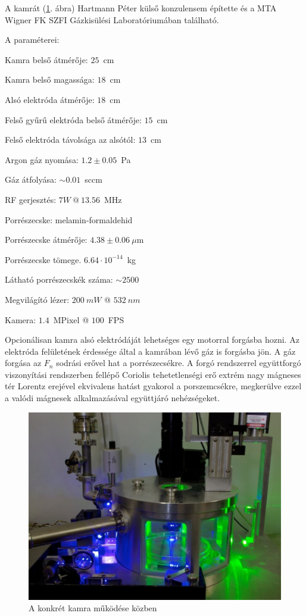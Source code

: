	A kamrát (\ref{fig:kamra}. ábra) Hartmann Péter külső konzulensem építette és a MTA Wigner FK SZFI
	Gázkisülési Laboratóriumában található.
	
	\noindent A paraméterei:
	\begin{myitemize*}
		\item Kamra belső átmérője: $25$~cm
		\item Kamra belső magassága: $18$~cm
		\item Alsó elektróda átmérője: $18$~cm
		\item Felső gyűrű elektróda belső átmérője: $15$~cm
		\item Felső elektróda távolsága az alsótól: $13$~cm
		\item Argon gáz nyomása: $1.2\pm0.05$~Pa
		\item Gáz átfolyása: $\sim 0.01$~sccm
		\item RF gerjesztés: $7W\ @ \ 13.56$~MHz
		\item Porrészecske: melamin-formaldehid
		\item Porrészecske átmérője: $4.38\pm 0.06~\mu$m
		\item Porrészecske tömege. $6.64\cdot10^{-14} $~kg
		\item Látható porrészecskék száma: $\sim 2500$
		\item Megvilágító lézer: $200~mW$ @  $532~nm$
		\item Kamera: $1.4$~MPixel @ $100$~FPS
	\end{myitemize*}
	{\color{red}Opcionálisan} kamra alsó elektródáját lehetséges egy motorral forgásba
        hozni. Az elektróda felületének érdessége által a kamrában
	lévő gáz is forgásba jön. A gáz forgása az $F_n$ sodrási erővel hat a porrészecsékre.
	{\color{red}A forgó rendszerrel együttforgó viszonyítási
          rendszerben fellépő Coriolis tehetetlenségi erő extrém nagy
          mágneses tér Lorentz erejével ekvivalens hatást gyakorol a
          porszemcsékre, megkerülve ezzel a valódi mágnesek
          alkalmazásával együttjáró nehézségeket.}
	\begin{figure}[H]
		\centering
		\includegraphics[width=0.9\columnwidth]{figures/eps/dusty2.eps}
		\caption{A konkrét kamra működése közben} 
		\label{fig:kamra}
	\end{figure}




